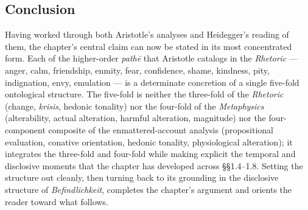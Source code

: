 \subsection{Conclusion}

Having worked through both Aristotle's analyses and Heidegger's reading of them, the chapter's central claim can now be stated in its most concentrated form. Each of the higher-order \textit{pathē} that Aristotle catalogs in the \textit{Rhetoric} --- anger, calm, friendship, enmity, fear, confidence, shame, kindness, pity, indignation, envy, emulation --- is a determinate concretion of a single five-fold ontological structure. The five-fold is neither the three-fold of the \textit{Rhetoric} (change, \textit{krisis}, hedonic tonality) nor the four-fold of the \textit{Metaphysics} (alterability, actual alteration, harmful alteration, magnitude) nor the four-component composite of the enmattered-account analysis (propositional evaluation, conative orientation, hedonic tonality, physiological alteration); it integrates the three-fold and four-fold while making explicit the temporal and disclosive moments that the chapter has developed across \S\S1.4--1.8. Setting the structure out cleanly, then turning back to its grounding in the disclosive structure of \textit{Befindlichkeit}, completes the chapter's argument and orients the reader toward what follows.

